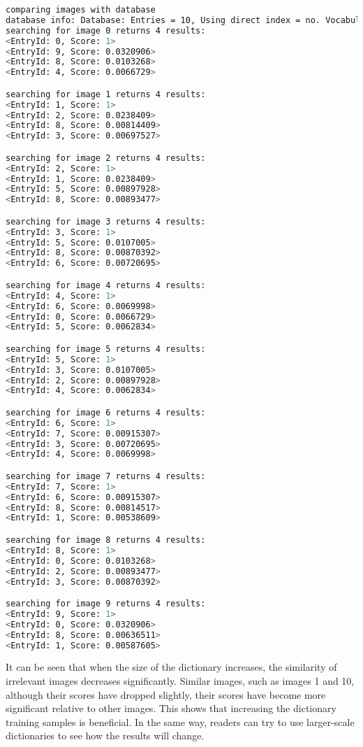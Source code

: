 \begin{lstlisting}[language=sh,caption=Terminal output:]
comparing images with database 
database info: Database: Entries = 10, Using direct index = no. Vocabulary: k = 10, L = 5, Weighting = tf-idf, Scoring = L1-norm, Number of words = 99566
searching for image 0 returns 4 results:
<EntryId: 0, Score: 1>
<EntryId: 9, Score: 0.0320906>
<EntryId: 8, Score: 0.0103268>
<EntryId: 4, Score: 0.0066729>

searching for image 1 returns 4 results:
<EntryId: 1, Score: 1>
<EntryId: 2, Score: 0.0238409>
<EntryId: 8, Score: 0.00814409>
<EntryId: 3, Score: 0.00697527>

searching for image 2 returns 4 results:
<EntryId: 2, Score: 1>
<EntryId: 1, Score: 0.0238409>
<EntryId: 5, Score: 0.00897928>
<EntryId: 8, Score: 0.00893477>

searching for image 3 returns 4 results:
<EntryId: 3, Score: 1>
<EntryId: 5, Score: 0.0107005>
<EntryId: 8, Score: 0.00870392>
<EntryId: 6, Score: 0.00720695>

searching for image 4 returns 4 results:
<EntryId: 4, Score: 1>
<EntryId: 6, Score: 0.0069998>
<EntryId: 0, Score: 0.0066729>
<EntryId: 5, Score: 0.0062834>

searching for image 5 returns 4 results:
<EntryId: 5, Score: 1>
<EntryId: 3, Score: 0.0107005>
<EntryId: 2, Score: 0.00897928>
<EntryId: 4, Score: 0.0062834>

searching for image 6 returns 4 results:
<EntryId: 6, Score: 1>
<EntryId: 7, Score: 0.00915307>
<EntryId: 3, Score: 0.00720695>
<EntryId: 4, Score: 0.0069998>

searching for image 7 returns 4 results:
<EntryId: 7, Score: 1>
<EntryId: 6, Score: 0.00915307>
<EntryId: 8, Score: 0.00814517>
<EntryId: 1, Score: 0.00538609>

searching for image 8 returns 4 results:
<EntryId: 8, Score: 1>
<EntryId: 0, Score: 0.0103268>
<EntryId: 2, Score: 0.00893477>
<EntryId: 3, Score: 0.00870392>

searching for image 9 returns 4 results:
<EntryId: 9, Score: 1>
<EntryId: 0, Score: 0.0320906>
<EntryId: 8, Score: 0.00636511>
<EntryId: 1, Score: 0.00587605>
\end{lstlisting}

It can be seen that when the size of the dictionary increases, the similarity of irrelevant images decreases significantly. Similar images, such as images 1 and 10, although their scores have dropped slightly, their scores have become more significant relative to other images. This shows that increasing the dictionary training samples is beneficial. In the same way, readers can try to use larger-scale dictionaries to see how the results will change.

